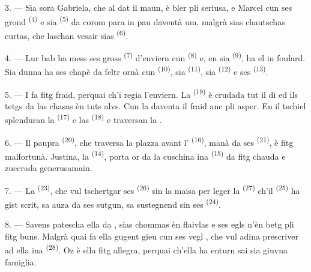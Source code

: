3. --- Sia sora Gabriela, che al dat il maun, è bler pli seriusa, e Marcel cun ses
grond  \textsuperscript{(4)} e sia 
\textsuperscript{(5)} da corom para in pau daventà um, malgrà sias chautschas curtas,
che laschan vesair sias  \textsuperscript{(6)}.

4. --- Lur bab ha mess ses gross  \textsuperscript{(7)} d'enviern cun
 \textsuperscript{(8)} e, en sia 
\textsuperscript{(9)}, ha el in foulard. Sia dunna ha ses chapè da feltr ornà cun
 \textsuperscript{(10)}, sia  \textsuperscript{(11)}, sia
 \textsuperscript{(12)} e ses 
\textsuperscript{(13)}.

5. --- I fa fitg fraid, perquai ch'i regia l'enviern. La 
\textsuperscript{(19)} è crudada tut il di ed ils tetgs da las chasas èn tuts alvs.
Cun la  daventa il fraid anc pli asper. En il tschiel splenduran la
 \textsuperscript{(17)} e las  \textsuperscript{(18)} e
traversan la .

\VUsaut{4.2mm}
\VUsaut{3.0mm}

6. --- Il paupra  \textsuperscript{(20)}, che traversa la plazza avant
l' \textsuperscript{(16)}, manà da ses 
\textsuperscript{(21)}, è fitg malfortunà. Justina, la 
\textsuperscript{(14)}, porta or da la cuschina ina 
\textsuperscript{(15)} da  fitg chauda e zuccrada generusamain.

7. --- La  \textsuperscript{(23)}, che vul tschertgar ses
 \textsuperscript{(26)} sin la maisa per leger la 
\textsuperscript{(27)} ch'il  \textsuperscript{(25)} ha gist scrit, sa
auza da ses sutgun, sa sustegnend sin ses  \textsuperscript{(24)}.

8. --- Savens patescha ella da , sias chommas èn flaivlas e ses egls n'èn betg pli fitg buns. Malgrà quai fa
ella gugent gieu cun ses vegl , che vul adina prescriver ad ella ina
 \textsuperscript{(28)}. Oz è ella fitg allegra, perquai ch'ella ha
enturn sai sia giuvna famiglia.

